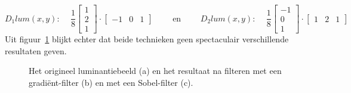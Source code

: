 \begin{displaymath}
D_1 lum(x,y)\textrm{: }\quad \frac{1}{8} \left[ \begin{array}{c} 1 \\ 2 \\ 1 \end{array} \right] \cdot \left[ \begin{array}{ccc} -1 & 0 & 1 \end{array} \right] \qquad \textrm{ en } 
\qquad D_2 lum(x,y)\textrm{: }\quad \frac{1}{8} \left[ \begin{array}{c} -1 \\ 0 \\ 1 \end{array} \right] \cdot \left[ \begin{array}{ccc} 1 & 2 & 1 \end{array} \right]
\end{displaymath}
Uit figuur~\ref{fig:randdetectie} blijkt echter dat beide technieken geen spectaculair verschillende 
resultaten geven.

\begin{figure}[!b]
\vspace{10pt}
\centering
{}
\caption{\label{fig:randdetectie}Het origineel luminantiebeeld (a) en het resultaat na 
filteren met een gradi\"ent-filter (b) en met een Sobel-filter (c).}
\end{figure}


